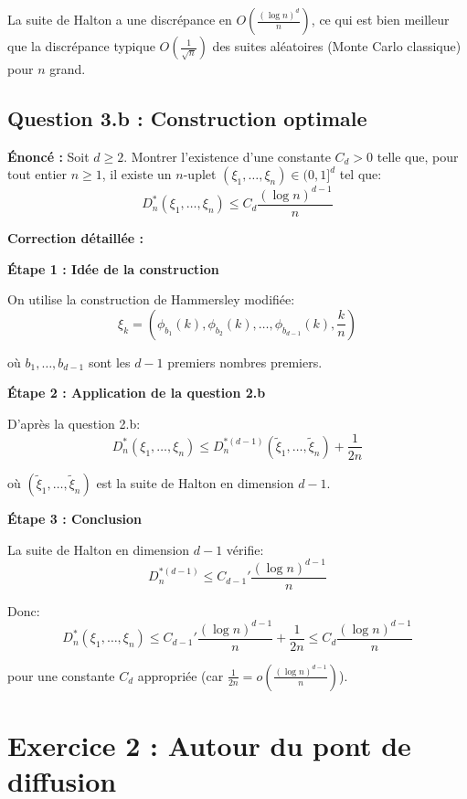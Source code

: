 \documentclass[12pt,a4paper]{article}
\theoremstyle{definition}
\begin{document}
\begin{astuce}
La suite de Halton a une discrépance en $O\left(\frac{(\log n)^d}{n}\right)$, ce qui est bien meilleur que la discrépance typique $O\left(\frac{1}{\sqrt{n}}\right)$ des suites aléatoires (Monte Carlo classique) pour $n$ grand.
\end{astuce}

\subsection{Question 3.b : Construction optimale}

\textbf{Énoncé :} Soit $d \geq 2$. Montrer l'existence d'une constante $C_d > 0$ telle que, pour tout entier $n \geq 1$, il existe un $n$-uplet $(\xi_1, \ldots, \xi_n) \in (0,1]^d$ tel que:
\[
D_n^*(\xi_1, \ldots, \xi_n) \leq C_d \frac{(\log n)^{d-1}}{n}
\]

\textbf{Correction détaillée :}

\textbf{Étape 1 : Idée de la construction}

On utilise la construction de Hammersley modifiée:
\[
\xi_k = \left( \phi_{b_1}(k), \phi_{b_2}(k), \ldots, \phi_{b_{d-1}}(k), \frac{k}{n} \right)
\]

où $b_1, \ldots, b_{d-1}$ sont les $d-1$ premiers nombres premiers.

\textbf{Étape 2 : Application de la question 2.b}

D'après la question 2.b:
\[
D_n^*(\xi_1, \ldots, \xi_n) \leq D_n^{*(d-1)}(\tilde{\xi}_1, \ldots, \tilde{\xi}_n) + \frac{1}{2n}
\]

où $(\tilde{\xi}_1, \ldots, \tilde{\xi}_n)$ est la suite de Halton en dimension $d-1$.

\textbf{Étape 3 : Conclusion}

La suite de Halton en dimension $d-1$ vérifie:
\[
D_n^{*(d-1)} \leq C_{d-1}' \frac{(\log n)^{d-1}}{n}
\]

Donc:
\[
D_n^*(\xi_1, \ldots, \xi_n) \leq C_{d-1}' \frac{(\log n)^{d-1}}{n} + \frac{1}{2n} \leq C_d \frac{(\log n)^{d-1}}{n}
\]

pour une constante $C_d$ appropriée (car $\frac{1}{2n} = o\left(\frac{(\log n)^{d-1}}{n}\right)$).

\section{Exercice 2 : Autour du pont de diffusion}
\end{document}
